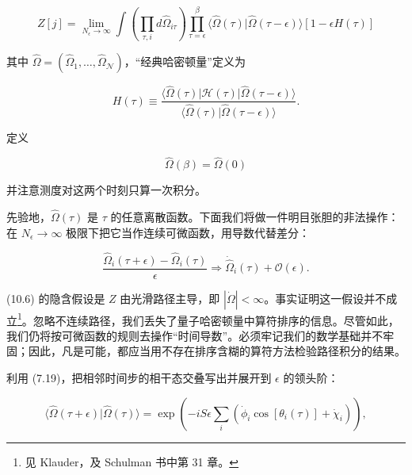 \begin{equation*}
Z [ j ] = \lim _ {N _ {\epsilon} \rightarrow \infty} \int \left( \prod_{\tau, i} d \hat {\Omega} _ {i \tau} \right) \prod_{\tau = \epsilon} ^ {\beta} \langle \hat {\Omega} ( \tau ) | \hat {\Omega} ( \tau - \epsilon ) \rangle \left[ 1 - \epsilon H ( \tau ) \right]
\tag{10.3}
\end{equation*}

其中 $\hat{\Omega} = (\hat{\Omega}_1, \ldots, \hat{\Omega}_{\mathcal{N}})$，“经典哈密顿量”定义为

\begin{equation*}
H ( \tau ) \equiv \frac {\langle \hat {\Omega} ( \tau ) | \mathcal {H} ( \tau ) | \hat {\Omega} ( \tau - \epsilon ) \rangle}{\langle \hat {\Omega} ( \tau ) | \hat {\Omega} ( \tau - \epsilon ) \rangle}.
\tag{10.4}
\end{equation*}

定义

\begin{equation*}
\hat {\Omega} ( \beta ) = \hat {\Omega} ( 0 )
\tag{10.5}
\end{equation*}

并注意测度对这两个时刻只算一次积分。

先验地，$\hat{\Omega}(\tau)$ 是 $\tau$ 的任意离散函数。下面我们将做一件明目张胆的非法操作：在 $N_{\epsilon} \to \infty$ 极限下把它当作连续可微函数，用导数代替差分：

\begin{equation*}
\frac {\hat {\Omega} _ {i} ( \tau + \epsilon ) - \hat {\Omega} _ {i} ( \tau )}{\epsilon} \Rightarrow \dot {\hat {\Omega}} _ {i} ( \tau ) + \mathcal {O} ( \epsilon ).
\tag{10.6}
\end{equation*}

(10.6) 的隐含假设是 $Z$ 由光滑路径主导，即 $|\dot{\Omega}| < \infty$。事实证明这一假设并不成立\footnote{见 Klauder，及 Schulman 书中第 31 章。}。忽略不连续路径，我们丢失了量子哈密顿量中算符排序的信息。尽管如此，我们仍将按可微函数的规则去操作“时间导数”。必须牢记我们的数学基础并不牢固；因此，凡是可能，都应当用不存在排序含糊的算符方法检验路径积分的结果。

利用 (7.19)，把相邻时间步的相干态交叠写出并展开到 $\epsilon$ 的领头阶：

\begin{equation*}
\langle \hat {\Omega} ( \tau + \epsilon ) | \hat {\Omega} ( \tau ) \rangle = \exp \left( - i S \epsilon \sum_ {i} \left( \dot {\phi} _ {i} \cos [ \theta_ {i} ( \tau ) ] + \dot {\chi} _ {i} \right) \right) ,
\tag{10.7}
\end{equation*}

